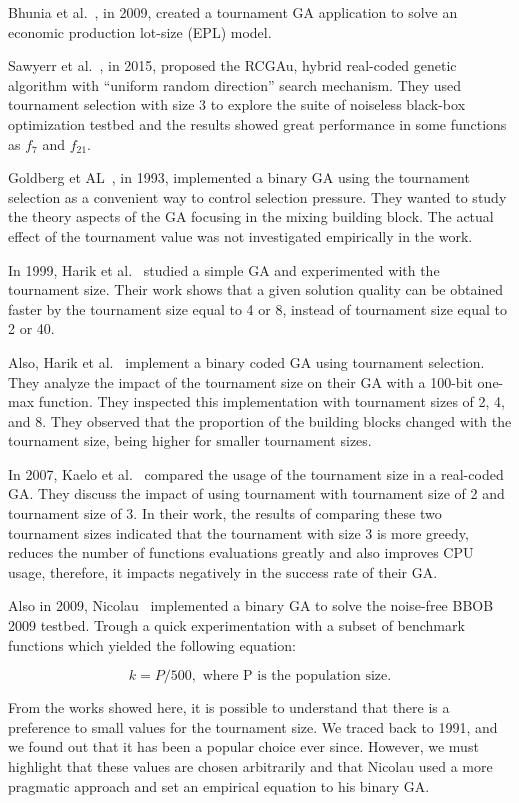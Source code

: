 Bhunia et al.~\cite{bhunia2009application}, in 2009, created a tournament GA application to solve an economic production lot-size (EPL) model. 

Sawyerr et al.~\cite{sawyerr2015benchmarking}, in 2015, proposed the RCGAu, hybrid real-coded genetic algorithm with ``uniform random direction'' search mechanism. They used tournament selection with size 3 to explore the suite of noiseless black-box optimization testbed and the results showed great performance in some functions as $f_7$ and $f_{21}$.

Goldberg et AL~\cite{goldberg1993toward}, in 1993, implemented a binary GA using the tournament selection as a convenient way to control selection pressure. They wanted to study the theory aspects of the GA focusing in the mixing building block. The actual effect of the tournament value was not investigated empirically in the work.

In 1999, Harik et al.~\cite{harik1999compact} studied a simple GA and experimented with the tournament size. Their work shows that a given solution quality can be obtained faster by the tournament size equal to 4 or 8, instead of tournament size equal to 2 or 40. 

Also, Harik et al.~\cite{harik1999gambler} implement a binary coded GA using tournament selection. They analyze the impact of the tournament size on their GA with a 100-bit one-max function. They inspected this implementation with tournament sizes of 2, 4, and 8. They observed that the proportion of the building blocks changed with the tournament size, being higher for smaller tournament sizes.

In 2007, Kaelo et al.~\cite{kaelo2007integrated} compared the usage of the tournament size in a real-coded GA. They discuss the impact of using tournament with tournament size of 2 and tournament size of 3. In their work, the results of comparing these two tournament sizes indicated that the tournament with size 3 is more greedy, reduces the number of functions evaluations greatly and also improves CPU usage, therefore, it impacts negatively in the success rate of their GA.


Also in 2009, Nicolau~\cite{nicolau2009application} implemented a binary GA to solve the noise-free BBOB 2009 testbed. Trough a quick experimentation with a subset of benchmark functions which yielded the following equation:

\vspace{-3mm}
\begin{equation}
k = P/500, \text{ where P is the population size.}
\end{equation}


From the works showed here, it is possible to understand that there is a preference to small values for the tournament size. We traced back to 1991, and we found out that it has been a popular choice ever since. However, we must highlight that these values are chosen arbitrarily and that Nicolau used a more pragmatic approach and set an empirical equation to his binary GA. 




